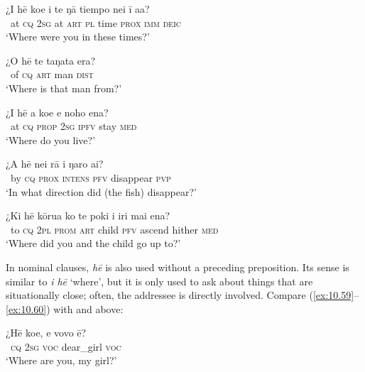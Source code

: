 \ea\label{ex:10.54}
\gll ¿{\ꞌ}I hē koe {\ꞌ}i te ŋā tiempo nei {\ꞌ}ī a{\ꞌ}a? \\
~at \textsc{cq} \textsc{2sg} at \textsc{art} \textsc{pl} time \textsc{prox} \textsc{imm} \textsc{deic} \\

\glt 
‘Where were you in these times?’ \textstyleExampleref{[R415.349]} 
\z

\ea\label{ex:10.55}
\gll ¿O hē te taŋata era? \\
~of \textsc{cq} \textsc{art} man \textsc{dist} \\

\glt 
‘Where is that man from?’ \textstyleExampleref{[Ley-3-06.003]}
\z

\ea\label{ex:10.56}
\gll ¿{\ꞌ}I hē a koe e noho ena? \\
~at \textsc{cq} \textsc{prop} \textsc{2sg} \textsc{ipfv} stay \textsc{med} \\

\glt 
‘Where do you live?’ \textstyleExampleref{[R399.052]} 
\z

\ea\label{ex:10.57}
\gll ¿A hē nei rā i ŋaro ai?\\
~by \textsc{cq} \textsc{prox} \textsc{intens} \textsc{pfv} disappear \textsc{pvp}\\

\glt 
‘In what direction did (the fish) disappear?’ \textstyleExampleref{[R301.179]} 
\z

\ea\label{ex:10.58}
\gll ¿Ki hē kōrua ko te poki i iri mai ena? \\
~to \textsc{cq} \textsc{2pl} \textsc{prom} \textsc{art} child \textsc{pfv} ascend hither \textsc{med} \\

\glt
‘Where did you and the child go up to?’ \textstyleExampleref{[R229.205]} 
\z

In nominal clauses, \textit{hē} is also used without a preceding preposition. Its sense is similar to \textit{{\ꞌ}i hē} ‘where’, but it is only used to ask about things that are situationally close; often, the addressee is directly involved. Compare (\ref{ex:10.59}–\ref{ex:10.60}) with  and  above:

\ea\label{ex:10.59}
\gll ¿Hē koe, e vovo ē? \\
~\textsc{cq} \textsc{2sg} \textsc{voc} dear\_girl \textsc{voc} \\

\glt 
‘Where are you, my girl?’ \textstyleExampleref{[R372.030]} 
\z

